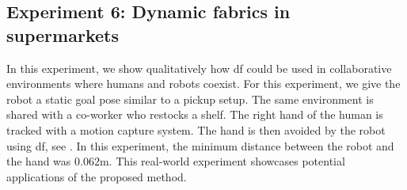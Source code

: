 \subsection{Experiment 6: Dynamic fabrics in supermarkets}%
\label{sub:experemint_6_dynamic_fabrics_in_supermarkets}
%
In this experiment, we show qualitatively how \ac{df} could be used in
collaborative environments where humans and robots coexist. For this
experiment, we give the robot a static goal pose similar to a pickup setup. The
same environment is shared with a co-worker who restocks a shelf. The right
hand of the human is tracked with a motion capture system.
The hand is then avoided by the robot using \ac{df}, see
. In this experiment, the minimum distance
between the robot and the hand was $0.062$m. This real-world experiment
showcases potential applications of the proposed method.
